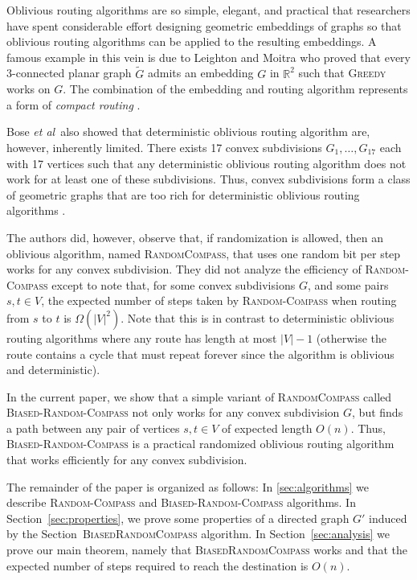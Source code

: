 \documentclass [letterpaper] {article}
\newcommand{\R}{\mathbb{R}}
\newcommand{\etal}{\emph{et al}}
\begin{document}
Oblivious routing algorithms are so simple, elegant, and practical that researchers have spent considerable effort designing geometric embeddings of graphs so that oblivious routing algorithms can be applied to the resulting embeddings.  A famous example in this vein is due to Leighton and Moitra \cite{lm08} who proved that every 3-connected planar graph $\tilde G$ admits an embedding $G$ in $\R^2$ such that \textsc{Greedy} works on $G$.  The combination of the embedding and routing algorithm represents a form of \emph{compact routing} \cite{l94}.

Bose \etal\ also showed that deterministic oblivious routing algorithm are, however, inherently limited. There exists 17 convex subdivisions $G_1,\ldots,G_{17}$ each with 17 vertices such that any deterministic oblivious routing algorithm does not work for at least one of these subdivisions.  Thus, convex subdivisions form a class of geometric graphs that are too rich for deterministic oblivious routing algorithms \cite{bose02}.

The authors \cite{bose02,bose04} did, however, observe that, if randomization is allowed, then an oblivious algorithm, named \textsc{RandomCompass}, that uses one random bit per step works for any convex subdivision. They did not analyze the efficiency of \textsc{Random-Compass} except to note that, for some convex subdivisions $G$, and some pairs $s,t\in V$, the expected number of steps taken by \textsc{Random-Compass} when routing from $s$ to $t$ is $\Omega(|V|^2)$.   Note that this is in contrast to deterministic oblivious routing algorithms where any route has length at most $|V|-1$ (otherwise the route contains a cycle that must repeat forever since the algorithm is oblivious and deterministic).

In the current paper, we show that a simple variant of \textsc{RandomCompass} called \textsc{Biased-Random-Compass} not only works for any convex subdivision $G$, but finds a path between any pair of vertices $s,t\in V$ of expected length $O(n)$.  Thus, \textsc{Biased-Random-Compass} is a practical randomized oblivious routing algorithm that works efficiently for any convex subdivision.

The remainder of the paper is organized as follows: In \ref{sec:algorithms} we describe \textsc{Random-Compass} and \textsc{Biased-Random-Compass} algorithms.  In Section~\ref{sec:properties}, we prove some properties of a directed graph $G'$ induced by the Section~\textsc{BiasedRandomCompass} algorithm.  In Section~\ref{sec:analysis} we prove our main theorem, namely that \textsc{BiasedRandomCompass} works and that the expected number of steps required to reach the destination is $O(n)$.
\end{document}
